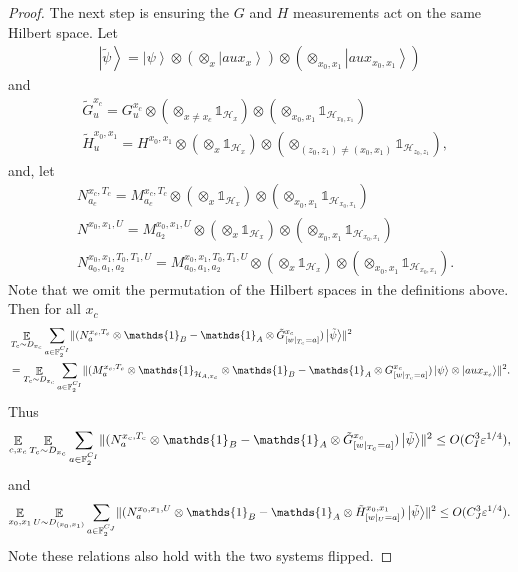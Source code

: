 \documentclass[10pt,a4paper]{article}
\theoremstyle{plain}
\theoremstyle{definition}
\DeclarePairedDelimiter{\norm}{\lVert}{\rVert}
\newcommand {\ket} [1] {\ensuremath{ \left| #1 \right\rangle }}
\DeclareMathOperator*{\bigE}{\mathbb{E}}
\newcommand {\id} {\ensuremath{\mathds{1}}}
\newcommand{\ep} {\ensuremath{\varepsilon}}
\newcommand{\x}{\otimes}
\newcommand{\calH}{\mathcal{H}}
\newcommand{\1}{\mathbb{1}} %
\newcommand{\bF}{\mathbb{F}}
\newcommand{\tG}{\tilde{G}}
\newcommand{\tH}{\tilde{H}}
\newcommand{\tpsi}{\tilde{\psi}}
\begin{document}
\begin{proof}
The next step is ensuring the $G$ and $H$ measurements act on the same Hilbert space.
Let 
\begin{align*}
\ket{\tpsi} = \ket{\psi} \x (\x_{x} \ket{aux_{x}}) \x (\x_{x_0,x_1} \ket{aux_{x_0,x_1}})
\end{align*}
and
\begin{align*}
	&\tG^{x_c}_u = G^{x_c}_u \x (\x_{x \neq x_c} \id_{\calH_{x}}) \x (\x_{x_0,x_1} \id_{\calH_{x_0,x_1}}) \\
	&\tH^{x_0,x_1}_u = H^{x_0,x_1} \x (\x_x \id_{\calH_x}) \x (\x_{(z_0,z_1) \neq (x_0,x_1)} \id_{\calH_{z_0,z_1}}),
\end{align*}
and, let 
\begin{align*}
	&N^{x_c, T_c}_{a_c}  = M^{x_c, T_c}_{a_c} \x (\x_x \id_{\calH_x}) \x (\x_{x_0,x_1} \id_{\calH_{x_0,x_1}}) \\
	&N^{x_0, x_1, U} = M^{x_0, x_1, U}_{a_2}  \x (\x_x \id_{\calH_x}) \x (\x_{x_0,x_1} \id_{\calH_{x_0,x_1}}) \\
	&N^{x_0, x_1, T_0, T_1, U}_{a_0,a_1,a_2} = M^{x_0, x_1, T_0, T_1, U}_{a_0,a_1,a_2} \x  (\x_x \id_{\calH_x}) \x (\x_{x_0,x_1} \id_{\calH_{x_0,x_1}}). 
\end{align*}
Note that we omit the permutation of the Hilbert spaces in the definitions above.
Then for all $x_c$
\begin{align*}
	&\bigE_{T_c \sim D_{x_c}} \sum_{a \in \bF_2^{C_I}} \norm{  (N^{x_c, T_c}_a  \x \id_B -\id_A \x \tG^{x_c}_{[w|_{T_c} =a]})\ket{\tpsi}}^2\\
	&=
	\bigE_{T_c \sim D_{x_c}} \sum_{a \in \bF_2^{C_I}} \norm{  (M^{x_c, T_c}_a \x \id_{\calH_{A, x_c}} \x \id_B -\id_A \x G^{x_c}_{[w|_{T_c} =a]})\ket{\psi} \x \ket{aux_{x_c}}}^2.
\end{align*}
Thus
\begin{align}
	\label{eq:N_to_G}
	\bigE_{c,x_c}\bigE_{T_c \sim D_{x_c}} \sum_{a \in \bF_2^{C_I}} \norm{  (N^{x_c, T_c}_a \x \id_B -\id_A \x \tG^{x_c}_{[w|_{T_c} =a]})\ket{\tpsi}}^2 \leq O(C_I^3\ep^{1/4}),
\end{align}
and
\begin{align}
	\label{eq:N_to_H}
	\bigE_{x_0,x_1} \bigE_{U \sim D_{(x_0,x_1)}} \sum_{a \in \bF_2^{C_J}} \norm{  (N^{x_0,x_1, U}_a \x \id_B -\id_A \x \tH^{x_0,x_1}_{[w|_{U} =a]})\ket{\tpsi}}^2 \leq O(C_J^3\ep^{1/4}).
\end{align}
Note these relations also hold with the two systems flipped. 


\end{proof}
\end{document}
